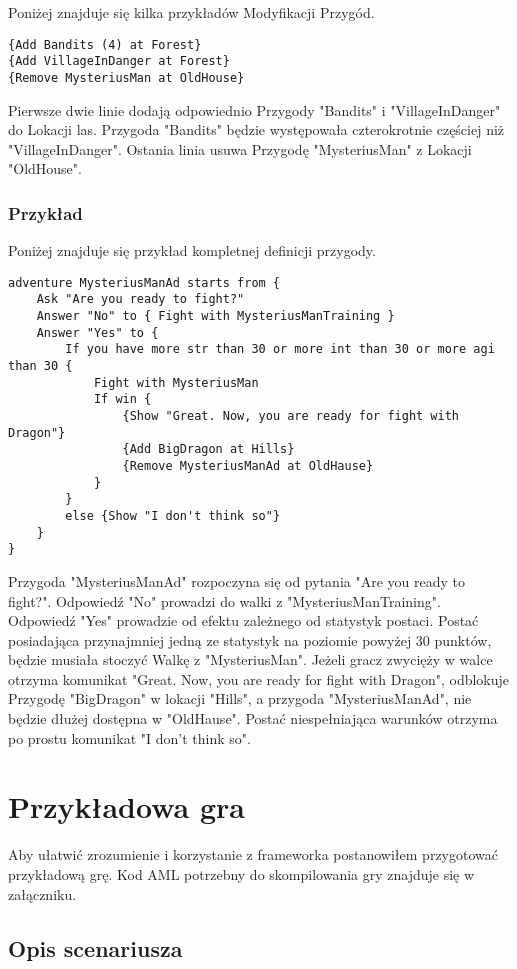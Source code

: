\documentclass	{xmgr}
\begin{document}
Poniżej znajduje się kilka przykładów Modyfikacji Przygód. 
\begin{lstlisting}
{Add Bandits (4) at Forest}
{Add VillageInDanger at Forest}
{Remove MysteriusMan at OldHouse}
\end{lstlisting}
Pierwsze dwie linie dodają odpowiednio Przygody "Bandits" i "VillageInDanger" do Lokacji las. Przygoda "Bandits" będzie występowała czterokrotnie częściej niż "VillageInDanger". Ostania linia usuwa Przygodę "MysteriusMan" z Lokacji "OldHouse".

\subsection*{Przykład}
Poniżej znajduje się przykład kompletnej definicji przygody.
\begin{lstlisting}
adventure MysteriusManAd starts from {
	Ask "Are you ready to fight?"
	Answer "No" to { Fight with MysteriusManTraining }
	Answer "Yes" to {
		If you have more str than 30 or more int than 30 or more agi than 30 {
			Fight with MysteriusMan
			If win {
				{Show "Great. Now, you are ready for fight with Dragon"}
				{Add BigDragon at Hills}
				{Remove MysteriusManAd at OldHause}
			}
		}
		else {Show "I don't think so"}
	}
}
\end{lstlisting}
Przygoda "MysteriusManAd" rozpoczyna się od pytania "Are you ready to fight?". Odpowiedź "No" prowadzi do walki z "MysteriusManTraining".
Odpowiedź "Yes" prowadzie od efektu zależnego od statystyk postaci. Postać posiadająca przynajmniej jedną ze statystyk na poziomie powyżej 30 punktów, będzie musiała stoczyć Walkę z "MysteriusMan". Jeżeli gracz zwycięży w walce otrzyma komunikat "Great. Now, you are ready for fight with Dragon", odblokuje Przygodę "BigDragon" w lokacji "Hills", a przygoda "MysteriusManAd", nie będzie dłużej dostępna w "OldHause". Postać niespełniająca warunków otrzyma po prostu komunikat "I don't think so". 

\chapter{Przykładowa gra}
Aby ułatwić zrozumienie i korzystanie z frameworka postanowiłem przygotować przykładową grę. Kod AML potrzebny do skompilowania gry znajduje się w załączniku.

\section{Opis scenariusza}
\end{document}
